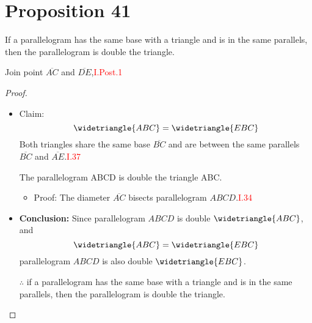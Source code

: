 
\section*{Proposition 41}

\begin{thm} 
If a parallelogram has the same base with a triangle and is in the same parallels, then the parallelogram is double the triangle.
\end{thm}

\begin{figure}[H]
	\caption{}
\end{figure}

Join point $\overline{AC}$ and $\overline{DE}$,\hfill\textcolor{red}{I.Post.1}

\begin{figure}[H]
	\caption{}
\end{figure}

\begin{proof}

\begin{itemize}

\item Claim: 
\[\widetriangle{ABC} = \widetriangle{EBC}\]
Both triangles share the same base $\overline{BC}$ and are between the same parallels $\overline{BC}$ and $\overline{AE}$.\hfill\textcolor{red}{I.37}


\begin{lemma}
The parallelogram ABCD is double the triangle ABC.
\end{lemma}
\begin{itemize}
\item Proof: The diameter $\overline{AC}$ bisects parallelogram $ABCD$.\hfill\textcolor{red}{I.34}
\end{itemize}

\item \textbf{Conclusion:} Since parallelogram $ABCD$ is double $\widetriangle{ABC}$, and 
\[\widetriangle{ABC} = \widetriangle{EBC}\] 
parallelogram $ABCD$ is also double $\widetriangle{EBC}$.

\item[$\therefore$] if a parallelogram has the same base with a triangle and is in the same parallels, then the parallelogram is double the triangle.

\end{itemize}

\end{proof}

\clearpage
